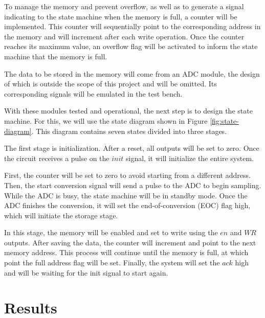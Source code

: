 \documentclass[conference]{IEEEtran}
\begin{document}
	To manage the memory and prevent overflow, as well as to generate a signal indicating to the state machine when the memory is full, a counter will be implemented. This counter will sequentially point to the corresponding address in the memory and will increment after each write operation. Once the counter reaches its maximum value, an overflow flag will be activated to inform the state machine that the memory is full.
	
	The data to be stored in the memory will come from an ADC module, the design of which is outside the scope of this project and will be omitted. Its corresponding signals will be emulated in the test bench.
	
	With these modules tested and operational, the next step is to design the state machine. For this, we will use the state diagram shown in Figure \ref{fig:state-diagram}. This diagram contains seven states divided into three stages.
	
	
   The first stage is initialization. After a reset, all outputs will be set to zero. Once the circuit receives a pulse on the $init$ signal, it will initialize the entire system. 
   
   First, the counter will be set to zero to avoid starting from a different address. Then, the start conversion signal will send a pulse to the ADC to begin sampling. While the ADC is busy, the state machine will be in standby mode. Once the ADC finishes the conversion, it will set the end-of-conversion (EOC) flag high, which will initiate the storage stage.
   
   In this stage, the memory will be enabled and set to write using the $en$ and $WR$ outputs. After saving the data, the counter will increment and point to the next memory address. This process will continue until the memory is full, at which point the full address flag will be set. Finally, the system will set the $ack$ high and will be waiting for the init signal to start again.
	
	\section{Results}
	
\end{document}
